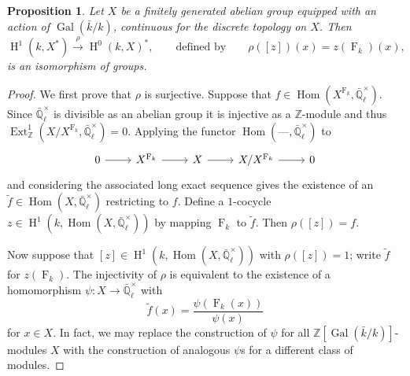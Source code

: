 \documentclass[11pt]{amsart}
\theoremstyle{plain}
\newtheorem{proposition}[theorem]{Proposition}
\theoremstyle{definition}
\theoremstyle{remark}
\newcommand{\ZZ}{{\mathbb{Z}}}
\newcommand{\EE}{\mathbb{\bar Q}_\ell}
\newcommand{\bFq}{\bar{k}}
\newcommand{\Fq}{k}
\newcommand{\EEx}{\EE^\times}
\DeclareMathOperator{\Gal}{Gal}
\newcommand{\Frob}[1]{\operatorname{F}_{#1}}
\DeclareMathOperator{\Hom}{Hom}
\DeclareMathOperator{\Ext}{Ext}
\DeclareMathOperator{\Hh}{H}
\begin{document}
\begin{proposition}\label{prop:X}
  Let $X$ be a finitely generated abelian group equipped with an
  action of $\Gal(\bFq/\Fq)$, continuous for the discrete topology on
  $X$.  Then
\[
    \Hh^1(\Fq, X^*) \xrightarrow{\rho} \Hh^0(\Fq, X)^*,
 \qquad \text{defined by}\qquad
   \rho([z])(x) = z(\Frob{\Fq})(x),
\]
  is an isomorphism of groups.
\end{proposition}
\begin{proof}
  We first prove that $\rho$ is surjective.  Suppose that
  $f \in \Hom(X^{\Frob{\Fq}}, \EEx).$ Since $\EEx$ is divisible
  as an abelian group it is injective as a $\ZZ$-module and thus
  $\Ext^1_{\ZZ}(X/X^{\Frob{\Fq}}, \EEx) = 0$.  Applying the functor
  $\Hom(\mbox{---}, \EEx)$ to
  \[
  \begin{tikzcd}
  0 \rar & X^{\Frob{\Fq}} \rar & X \rar & X/X^{\Frob{\Fq}} \rar & 0
  \end{tikzcd}
  \]
  and considering the associated long exact sequence gives the
  existence of an $\tilde{f} \in \Hom(X, \EEx)$ restricting to
  $f$.  Define a $1$-cocycle $z \in \Hh^1(\Fq, \Hom(X,\EEx))$ by
  mapping $\Frob{\Fq}$ to $\tilde{f}$.  Then $\rho([z]) = f$.

  Now suppose that $[z] \in \Hh^1(\Fq,\Hom(X,\EEx))$ with
  $\rho([z]) = 1$; write $\tilde{f}$ for $z(\Frob{\Fq})$.  The injectivity
  of $\rho$ is equivalent to the existence of a homomorphism $\psi
  \colon X \rightarrow \EEx$ with
  $$\tilde{f}(x) = \frac{\psi(\Frob{\Fq}(x))}{\psi(x)}$$
  for $x \in X$.  In fact, we may replace the construction of $\psi$
  for all $\ZZ[\Gal(\bFq/\Fq)]$-modules $X$ with the construction of
  analogous $\psi$s for a different class of modules.


\end{proof}
\end{document}
